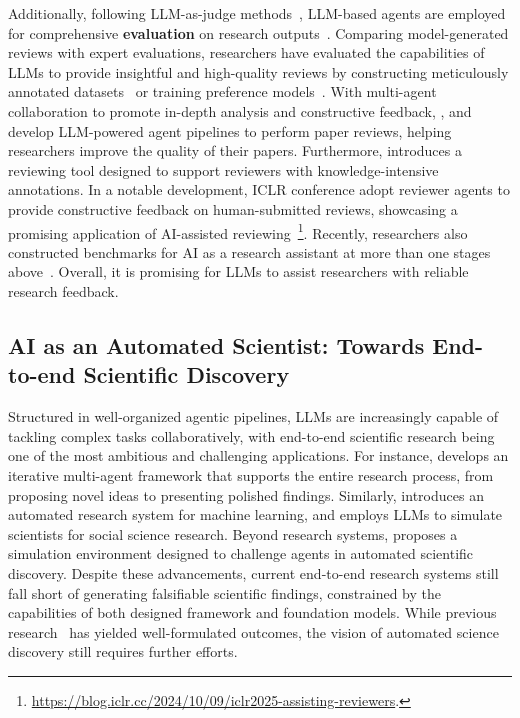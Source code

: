 \documentclass{article} %
\begin{document}
Additionally, following LLM-as-judge methods~\citep{zheng2023judging}, LLM-based agents are employed for comprehensive \textbf{evaluation} on research outputs~\citep{lu2024aiscientist, li2024mlrcopilotautonomousmachinelearning}. Comparing model-generated reviews with expert evaluations, researchers have evaluated the capabilities of LLMs to provide insightful and high-quality reviews by constructing meticulously annotated datasets~\citep{du2024llms} or training preference models~\citep{tyser2024ai}.
With multi-agent collaboration to promote in-depth analysis and constructive feedback, \citet{d2024marg}, \citet{jin2024agentreview} and \citet{yu2024automated} develop LLM-powered agent pipelines to perform paper reviews, helping researchers improve the quality of their papers. Furthermore, \citet{sun2024reviewflow} introduces a reviewing tool designed to support reviewers with knowledge-intensive annotations. In a notable development, ICLR conference adopt reviewer agents to provide constructive feedback on human-submitted reviews, showcasing a promising application of AI-assisted reviewing~\footnote{\url{https://blog.iclr.cc/2024/10/09/iclr2025-assisting-reviewers}.}. Recently, researchers also constructed benchmarks for AI as a research assistant at more than one stages above~\citep{lou2024aaar10assessingaispotential}. Overall, it is promising for LLMs to assist researchers with reliable research feedback.


\subsection{AI as an Automated Scientist: Towards End-to-end Scientific Discovery}

Structured in well-organized agentic pipelines, LLMs are increasingly capable of tackling complex tasks collaboratively, with end-to-end scientific research being one of the most ambitious and challenging applications. For instance, \citet{lu2024aiscientist} develops an iterative multi-agent framework that supports the entire research process, from proposing novel ideas to presenting polished findings. Similarly, \citet{li2024mlrcopilotautonomousmachinelearning} introduces an automated research system for machine learning, and \citet{manning2024automated} employs LLMs to simulate scientists for social science research. Beyond research systems, \citet{jansen2024discoveryworld} proposes a simulation environment designed to challenge agents in automated scientific discovery. Despite these advancements, current end-to-end research systems still fall short of generating falsifiable scientific findings, constrained by the capabilities of both designed framework and foundation models. While previous research~\citep{lu2024aiscientist} has yielded well-formulated outcomes, the vision of automated science discovery still requires further efforts.
\end{document}
